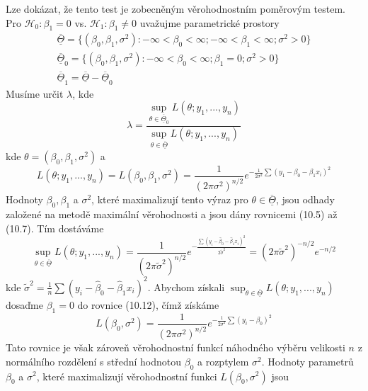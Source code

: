 Lze dokázat, že tento test je zobecněným věrohodnostním poměrovým testem. Pro $\mathscr{H}_0: \beta_1 = 0$ vs. $\mathscr{H}_1: \beta_1 \neq 0$ uvažujme parametrické prostory
\begin{gather*}
\overline{\underline{\Theta}} = \{(\beta_0, \beta_1, \sigma^2): -\infty < \beta_0 < \infty; -\infty < \beta_1 < \infty; \sigma^2 > 0\}\\
\overline{\underline{\Theta}}_0 = \{(\beta_0, \beta_1, \sigma^2): -\infty < \beta_0 < \infty; \beta_1 = 0; \sigma^2 > 0\}\\
\overline{\underline{\Theta}}_1 = \overline{\underline{\Theta}} - \overline{\underline{\Theta}}_0
\end{gather*}
Musíme určit $\lambda$, kde
\begin{equation*}
\lambda = \frac{\sup_{\theta \in \overline{\underline{\Theta}}_0}L(\theta; y_1, ..., y_n)}{\sup_{\theta \in \overline{\underline{\Theta}}}L(\theta; y_1, ..., y_n)}
\end{equation*}
kde $\theta = (\beta_0, \beta_1, \sigma^2)$ a
\begin{equation}
L(\theta; y_1, ..., y_n) = L(\beta_0, \beta_1, \sigma^2) = \frac{1}{(2 \pi \sigma^2)^{n/2}}e^{-\frac{1}{2 \sigma^2}\sum(y_1 - \beta_0 - \beta_1x_i)^2}
\end{equation}
Hodnoty $\beta_0, \beta_1$ a $\sigma^2$, které maximalizují tento výraz pro $\theta \in \overline{\underline{\Theta}}$, jsou odhady založené na metodě maximální věrohodnosti a jsou dány rovnicemi (10.5) až (10.7). Tím dostáváme
\begin{equation*}
\sup_{\theta \in \overline{\underline{\Theta}}}L(\theta; y_1, ..., y_n) = \frac{1}{(2 \pi \tilde{\sigma}^2)^{n/2}}e^{-\frac{\sum (y_i - \hat{\beta}_0 - \hat{\beta}_1 x_i)^2}{2 \tilde{\sigma}^2}} = (2 \pi \tilde{\sigma}^2)^{-n/2}e^{-n/2}
\end{equation*}
kde $\tilde{\sigma}^2 = \frac{1}{n}\sum (y_i - \hat{\beta}_0 - \hat{\beta}_1 x_i)^2$. Abychom získali $\sup_{\theta \in \overline{\underline{\Theta}}}L(\theta; y_1, ..., y_n)$ dosaďme $\beta_1 = 0$ do rovnice (10.12), čímž získáme
\begin{equation*}
L(\beta_0, \sigma^2) = \frac{1}{(2 \pi \sigma^2)^{n/2}}e^{-\frac{1}{2 \sigma^2}\sum (y_i - \beta_0)^2}
\end{equation*}
Tato rovnice je však zároveň věrohodnostní funkcí náhodného výběru velikosti $n$ z normálního rozdělení s střední hodnotou $\beta_0$ a rozptylem $\sigma^2$. Hodnoty parametrů $\beta_0$ a $\sigma^2$, které maximalizují věrohodnostní funkci $L(\beta_0, \sigma^2)$ jsou
